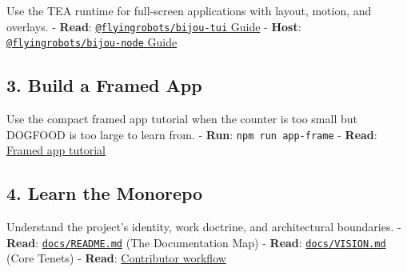 Use the TEA runtime for full-screen applications with layout, motion, and overlays. - \textbf{Read}: \href{https://github.com/flyingrobots/bijou/blob/cbd70612140e7a450d764b3c7be1c6af878b99bc/packages/bijou-tui/GUIDE.md}{\texttt{@\allowbreak{}f\allowbreak{}l\allowbreak{}y\allowbreak{}i\allowbreak{}n\allowbreak{}g\allowbreak{}r\allowbreak{}o\allowbreak{}b\allowbreak{}o\allowbreak{}t\allowbreak{}s\allowbreak{}/\allowbreak{}b\allowbreak{}i\allowbreak{}j\allowbreak{}o\allowbreak{}u\allowbreak{}-\allowbreak{}t\allowbreak{}u\allowbreak{}i} Guide} - \textbf{Host}: \href{https://github.com/flyingrobots/bijou/blob/cbd70612140e7a450d764b3c7be1c6af878b99bc/packages/bijou-node/GUIDE.md}{\texttt{@\allowbreak{}f\allowbreak{}l\allowbreak{}y\allowbreak{}i\allowbreak{}n\allowbreak{}g\allowbreak{}r\allowbreak{}o\allowbreak{}b\allowbreak{}o\allowbreak{}t\allowbreak{}s\allowbreak{}/\allowbreak{}b\allowbreak{}i\allowbreak{}j\allowbreak{}o\allowbreak{}u\allowbreak{}-\allowbreak{}n\allowbreak{}o\allowbreak{}d\allowbreak{}e} Guide}

\subsection{3. Build a Framed App}\label{record-008-build-a-framed-app}

Use the compact framed app tutorial when the counter is too small but DOGFOOD is too large to learn from. - \textbf{Run}: \texttt{n\allowbreak{}p\allowbreak{}m\allowbreak{} \allowbreak{}r\allowbreak{}u\allowbreak{}n\allowbreak{} \allowbreak{}a\allowbreak{}p\allowbreak{}p\allowbreak{}-\allowbreak{}f\allowbreak{}r\allowbreak{}a\allowbreak{}m\allowbreak{}e} - \textbf{Read}: \href{https://github.com/flyingrobots/bijou/blob/cbd70612140e7a450d764b3c7be1c6af878b99bc/docs/guides/framed-app-tutorial.md}{Framed app tutorial}

\subsection{4. Learn the Monorepo}\label{record-008-learn-the-monorepo}

Understand the project's identity, work doctrine, and architectural boundaries. - \textbf{Read}: \href{https://github.com/flyingrobots/bijou/blob/cbd70612140e7a450d764b3c7be1c6af878b99bc/docs/README.md}{\texttt{d\allowbreak{}o\allowbreak{}c\allowbreak{}s\allowbreak{}/\allowbreak{}R\allowbreak{}E\allowbreak{}A\allowbreak{}D\allowbreak{}M\allowbreak{}E\allowbreak{}.\allowbreak{}m\allowbreak{}d}} (The Documentation Map) - \textbf{Read}: \href{https://github.com/flyingrobots/bijou/blob/cbd70612140e7a450d764b3c7be1c6af878b99bc/docs/VISION.md}{\texttt{d\allowbreak{}o\allowbreak{}c\allowbreak{}s\allowbreak{}/\allowbreak{}V\allowbreak{}I\allowbreak{}S\allowbreak{}I\allowbreak{}O\allowbreak{}N\allowbreak{}.\allowbreak{}m\allowbreak{}d}} (Core Tenets) - \textbf{Read}: \href{https://github.com/flyingrobots/bijou/blob/cbd70612140e7a450d764b3c7be1c6af878b99bc/docs/WORKFLOW.md}{Contributor workflow}

